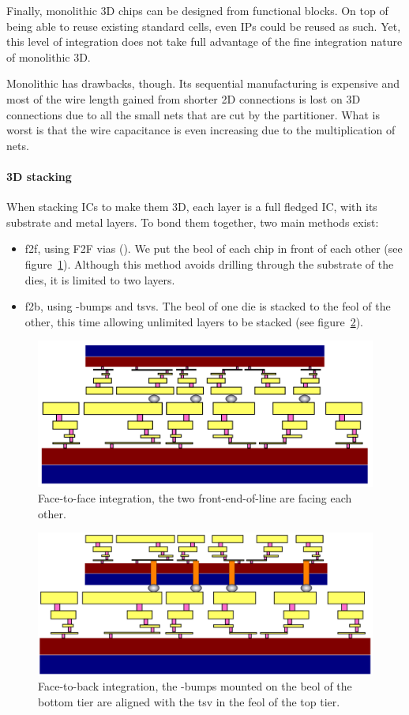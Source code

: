 \documentclass[11pt,a4paper]{report} %
\theoremstyle{customdef}
\begin{document}
Finally, monolithic 3D chips can be designed from functional blocks.
On top of being able to reuse existing standard cells, even IPs could be reused as such.
Yet, this level of integration does not take full advantage of the fine integration nature of monolithic 3D.

Monolithic has drawbacks, though.
Its sequential manufacturing is expensive and most of the wire length gained from shorter 2D connections is lost on 3D connections due to all the small nets that are cut by the partitioner.
What is worst is that the wire capacitance is even increasing due to the multiplication of nets.


\paragraph{3D stacking}
When stacking ICs to make them 3D, each layer is a full fledged IC, with its substrate and metal layers.
To bond them together, two main methods exist:
\begin{itemize}
	\item \gls{f2f}, using F2F vias (\citep{Peng2017}). We put the \gls{beol} of each chip in front of each other (see figure~\ref{fig:f2f}).
	Although this method avoids drilling through the substrate of the dies, it is limited to two layers.
	\item \gls{f2b}, using \textmu-bumps and \glspl{tsv}. The \gls{beol} of one die is stacked to the \gls{feol} of the other, this time allowing unlimited layers to be stacked (see figure~\ref{fig:f2b}).
\end{itemize}

\begin{figure}[!h]
\centering
\includegraphics[width=.6\textwidth]{img/f2f.png}
\caption{Face-to-face integration, the two front-end-of-line are facing each other.}
\label{fig:f2f}
\end{figure}

\begin{figure}[!h]
\centering
\includegraphics[width=.6\textwidth]{img/f2b.png}
\caption{Face-to-back integration, the \textmu-bumps mounted on the \gls{beol} of the bottom tier are aligned with the \gls{tsv} in the \gls{feol} of the top tier.}
\label{fig:f2b}
\end{figure}
\end{document}
